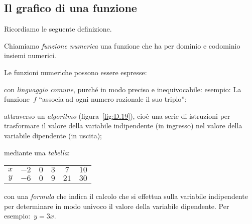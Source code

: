 \begin{comment}
% 
\(B\left(2;-\frac{1}{2}\right)\), 
% 
% 
% 
risolutiva}:~\(x_{M}=\frac{x_{A}+x_{B}}{2}=\frac{-{\frac{3}{4}}+2}{2}=\frac{5}{8
}
% 


\end{comment}

\subsection{Il grafico di una funzione}
\label{subsec:fun_grafico}

Ricordiamo le seguente definizione.
\begin{definizione}
Chiamiamo \emph{funzione numerica} una funzione che ha per dominio e 
codominio insiemi numerici.
\end{definizione}
Le funzioni numeriche possono essere espresse:
\begin{itemize*}
\item con \emph{linguaggio comune}, purché in modo preciso e inequivocabile: 
esempio: La funzione~\(f\)
 ``associa ad ogni numero razionale il suo triplo'';
\item attraverso un \emph{algoritmo} (figura~\ref{fig:D.19}), cioè una serie 
di istruzioni per trasformare il valore della variabile indipendente
(in ingresso) nel valore della variabile dipendente (in uscita);
\item mediante una \emph{tabella}:
 \begin{center}
\begin{tabular}{cccccc}
 \toprule
 \(x\) & \(-2\) & \(0\) & \(3\) & \(7\) & \(10\) \\
 \(y\) & \(-6\) & \(0\) & \(9\) & \(21\) & \(30\)\\
 \bottomrule
 \end{tabular}
 \end{center}
\item con una \emph{formula} che indica il calcolo che si effettua sulla 
variabile indipendente per determinare in modo univoco
il valore della variabile dipendente. Per esempio:~\(y=3x\).
\end{itemize*}
% 

